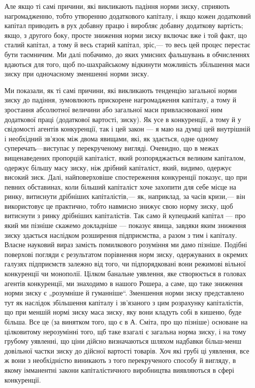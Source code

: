 \documentclass[12pt, a4paper, final]{memoir}
\begin{document}
Але якщо ті самі причини, які викликають падіння норми зиску, сприяють нагромадженню, тобто утворенню додаткового капіталу, і якщо кожен додатковий капітал приводить в рух добавну працю і виробляє добавну додаткову вартість; якщо, з другого боку, просте зниження норми зиску включає вже і той факт, що сталий капітал, а тому й весь старий капітал, зріс,— то весь цей процес перестає бути таємничим. Ми далі побачимо, до яких умисних фальшувань в обчисленнях вдаються для того, щоб по-шахрайському відкинути можливість збільшення маси зиску при одночасному зменшенні норми зиску.

Ми показали, як ті самі причини, які викликають тенденцію загальної норми зиску до падіння, зумовлюють прискорене нагромадження капіталу, а тому й зростання абсолютної величини або загальної маси привласнюваної ним додаткової праці (додаткової вартості, зиску). Як усе в конкуренції, а тому й у свідомості агентів конкуренції, так і цей закон — я маю на думці цей внутрішній і необхідний зв’язок між двома явищами, які, як здається, одне одному суперечать—виступає у перекрученому вигляді. Очевидно, що в межах вищенаведених пропорцій капіталіст, який розпоряджається великим капіталом, одержує більшу масу зиску, ніж дрібний капіталіст, який, видимо, одержує високий зиск. Далі, найповерховіше спостереження конкуренції показує, що при певних обставинах, коли більший капіталіст хоче захопити для себе місце на ринку, витиснути дрібніших капіталістів,— як, наприклад, за часів кризи,— він використовує це практично, тобто навмисно знижує свою норму зиску, щоб витиснути з ринку дрібніших капіталістів. Так само й купецький капітал — про який ми пізніше скажемо докладніше — показує явища, завдяки яким зниження зиску здається наслідком розширення підприємства, а разом з тим і капіталу. Власне науковий вираз замість помилкового розуміння ми дамо пізніше. Подібні поверхові погляди є результатом порівнення норм зиску, одержуваних в окремих галузях підприємств залежно від того, чи підпорядковані вони режимові вільної конкуренції чи монополії. Цілком банальне уявлення, яке створюється в головах агентів конкуренції, ми знаходимо в нашого Рошера, а саме, що таке зниження норми зиску є „розумніше й гуманніше“. Зменшення норми зиску представлено тут як наслідок збільшення капіталу і зв’язаного з цим розрахунку капіталістів, що при меншій нормі зиску маса зиску, яку вони кладуть собі в кишеню, буде більша. Все це (за винятком того, що є в А. Сміта, про що пізніше) основане на цілковитому нерозумінні того, щб таке взагалі є загальна норма зиску, і на тому грубому уявленні, що ціни дійсно визначаються шляхом надбавки більш-менш довільної частки зиску до дійсної вартості товарів. Хоч які грубі ці уявлення, все ж вони з необхідністю виникають з того перекрученого способу й вигляду, в якому імманентні закони капіталістичного виробництва виявляються в сфері конкуренції.
\end{document}
